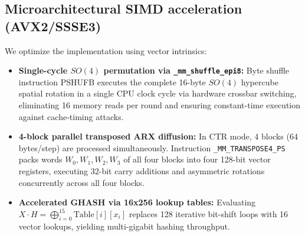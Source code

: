 \documentclass[10pt,twocolumn]{article}
\begin{document}
\subsection{Microarchitectural SIMD acceleration (AVX2/SSSE3)}
We optimize the implementation using vector intrinsics:
\begin{itemize}
    \item \textbf{Single-cycle $SO(4)$ permutation via \texttt{\_mm\_shuffle\_epi8}:} Byte shuffle instruction PSHUFB executes the complete 16-byte $SO(4)$ hypercube spatial rotation in a single CPU clock cycle via hardware crossbar switching, eliminating 16 memory reads per round and ensuring constant-time execution against cache-timing attacks.
    \item \textbf{4-block parallel transposed ARX diffusion:} In CTR mode, 4 blocks (64 bytes/step) are processed simultaneously. Instruction \texttt{\_MM\_TRANSPOSE4\_PS} packs words $W_0, W_1, W_2, W_3$ of all four blocks into four 128-bit vector registers, executing 32-bit carry additions and asymmetric rotations concurrently across all four blocks.
    \item \textbf{Accelerated GHASH via 16x256 lookup tables:} Evaluating $X \cdot H = \bigoplus_{i=0}^{15} \text{Table}[i][x_i]$ replaces 128 iterative bit-shift loops with 16 vector lookups, yielding multi-gigabit hashing throughput.
\end{itemize}

\begin{table}[htbp]
\caption{Microarchitectural hardware benchmark of SIMD acceleration and Rubik4D-GCM AEAD on 5~MB payload (50 iterations, Intel Core x86-64).}
\label{tab:simd_gcm_benchmark}
\centering
\small
{}
\end{table}
\end{document}

